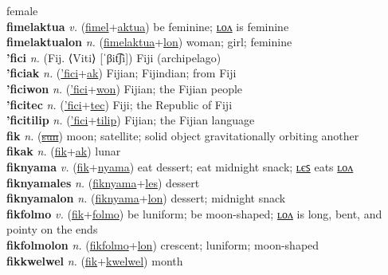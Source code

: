 female \label{fimelak} \\
\textbf{fimelaktua} \textit{v.} (\hyperref[fimel]{fimel}+\hyperref[aktua]{aktua})
be feminine; \hyperref[fimelaktualon]{ʟᴏᴧ} is feminine \label{fimelaktua} \\
\textbf{fimelaktualon} \textit{n.} (\hyperref[fimelaktua]{fimelaktua}+\hyperref[lon]{lon})
woman; girl; feminine \label{fimelaktualon} \\
\textbf{'fici} \textit{n.} (Fij. ⟨Viti⟩ [ˈβit͡ʃi])
Fiji (archipelago) \label{'fici} \\
\textbf{'ficiak} \textit{n.} (\hyperref['fici]{'fici}+\hyperref[ak]{ak})
Fijian; Fijindian; from Fiji \label{'ficiak} \\
\textbf{'ficiwon} \textit{n.} (\hyperref['fici]{'fici}+\hyperref[won]{won})
Fijian; the Fijian people \label{'ficiwon} \\
\textbf{'ficitec} \textit{n.} (\hyperref['fici]{'fici}+\hyperref[tec]{tec})
Fiji; the Republic of Fiji \label{'ficitec} \\
\textbf{'ficitilip} \textit{n.} (\hyperref['fici]{'fici}+\hyperref[tilip]{tilip})
Fijian; the Fijian language \label{'ficitilip} \\
\textbf{fik} \textit{n.} (\hyperref[sun]{\sout{sun}})
moon; satellite; solid object gravitationally orbiting another \label{fik} \\
\textbf{fikak} \textit{n.} (\hyperref[fik]{fik}+\hyperref[ak]{ak})
lunar \label{fikak} \\
\textbf{fiknyama} \textit{v.} (\hyperref[fik]{fik}+\hyperref[nyama]{nyama})
eat dessert; eat midnight snack; \hyperref[fiknyamales]{ʟєꜱ} eats \hyperref[fiknyamalon]{ʟᴏᴧ} \label{fiknyama} \\
\textbf{fiknyamales} \textit{n.} (\hyperref[fiknyama]{fiknyama}+\hyperref[les]{les})
dessert \label{fiknyamales} \\
\textbf{fiknyamalon} \textit{n.} (\hyperref[fiknyama]{fiknyama}+\hyperref[lon]{lon})
dessert; midnight snack \label{fiknyamalon} \\
\textbf{fikfolmo} \textit{v.} (\hyperref[fik]{fik}+\hyperref[folmo]{folmo})
be luniform; be moon-shaped; \hyperref[fikfolmolon]{ʟᴏᴧ} is long, bent, and pointy on the ends \label{fikfolmo} \\
\textbf{fikfolmolon} \textit{n.} (\hyperref[fikfolmo]{fikfolmo}+\hyperref[lon]{lon})
crescent; luniform; moon-shaped \label{fikfolmolon} \\
\textbf{fikkwelwel} \textit{n.} (\hyperref[fik]{fik}+\hyperref[kwelwel]{kwelwel})
month \label{fikkwelwel} \\
